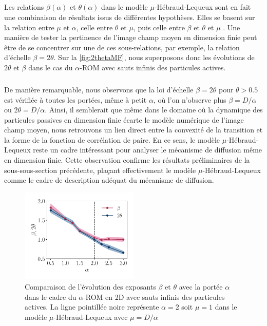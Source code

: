 \subparagraph{}Les relations $\beta(\alpha)$ et $\theta(\alpha)$ dans le modèle $\mu$-Hébraud-Lequeux sont en fait une combinaison de résultats issus de différentes hypothèses. Elles se basent sur la relation entre $\mu$ et $\alpha$, celle entre $\theta$ et $\mu$, puis celle entre $\beta$ et $\theta$ et $\mu$ \cite{lin_microscopic_2018}. Une manière de tester la pertinence de l'image champ moyen en dimension finie peut être de se concentrer sur une de ces sous-relations, par exemple, la relation d'échelle $\beta = 2\theta$. Sur la \autoref{fig:2thetaMF}, nous superposons donc les évolutions de $2\theta$ et $\beta$ dans le cas du $\alpha$-ROM avec sauts infinis des particules actives. 

\subparagraph{}De manière remarquable, nous observons que la loi d'échelle $\beta = 2\theta$ pour $\theta > 0.5$ est vérifiée à toutes les portées, même à petit $\alpha$, où l'on n'observe plus $\beta=D/\alpha$ ou $2\theta=D/\alpha$. Ainsi, il semblerait que même dans le domaine où la dynamique des particules passives en dimension finie écarte le modèle numérique de l'image champ moyen, nous retrouvons un lien direct entre la convexité de la transition et la forme de la fonction de corrélation de paire. En ce sens, le modèle $\mu$-Hébraud-Lequeux reste un cadre intéressant pour analyser le mécanisme de diffusion même en dimension finie. Cette observation confirme les résultats préliminaires de la sous-sous-section précédente, plaçant effectivement le modèle $\mu$-Hébraud-Lequeux comme le cadre de description adéquat du mécanisme de diffusion.

\begin{figure}[h]
	\centering
	\includegraphics[width=0.5\textwidth]{Chapitre3/Figures/Interpretation/beta_theta_alphaMF.pdf}
	\caption{Comparaison de l'évolution des exposants $\beta$ et $\theta$ avec la portée $\alpha$ dans le cadre du $\alpha$-ROM en 2D avec sauts infinis des particules actives. La ligne pointillée noire représente $\alpha = 2$ soit $\mu=1$ dans le modèle $\mu$-Hébraud-Lequeux avec $\mu=D/\alpha$}
	\label{fig:2thetaMF}
\end{figure}


